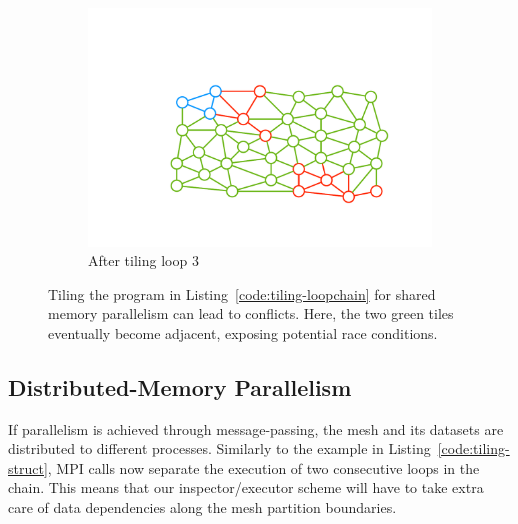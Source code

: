\begin{figure}[h]
\begin{subfigure}[b]{0.34\textwidth}
\includegraphics[width=\textwidth]{sparsetiling/figures/loop_2_conflicts.pdf}
\caption{After tiling loop 3}
\label{fig:st-conflicts-c}
\end{subfigure}%

\caption{Tiling the program in Listing~\ref{code:tiling-loopchain} for shared memory parallelism can lead to conflicts. Here, the two green tiles eventually become adjacent, exposing potential race conditions.}
\label{fig:st-conflicts}
\end{figure}

\subsection{Distributed-Memory Parallelism}
\label{sec:tiling:ex-dist}
If parallelism is achieved through message-passing, the mesh and its datasets are distributed to different processes. Similarly to the example in Listing~\ref{code:tiling-struct}, MPI calls now separate the execution of two consecutive loops in the chain. This means that our inspector/executor scheme will have to take extra care of data dependencies along the mesh partition boundaries.

